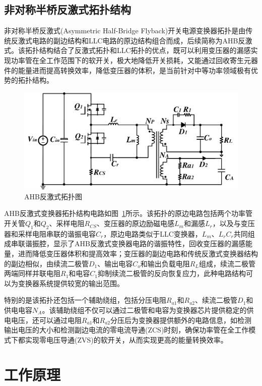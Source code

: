 \subsection{非对称半桥反激式拓扑结构}

非对称半桥反激式(Asymmetric Half-Bridge Flyback)开关电源变换器拓扑是由传统反激式电路的副边结构和LLC电路的原边结构组合而成，后续简称为AHB反激式。该拓扑结构结合了反激式拓扑和LLC拓扑的优点，既可以利用变压器的漏感实现功率管在全工作范围下的软开关，极大地降低开关损耗，又能通过回收寄生元器件的能量进而提高转换效率，降低变压器的体积，是当前针对中等功率领域极有优势的拓扑结构。

\begin{figure}[htbp] 
    \centering
    \includegraphics[width=0.8\linewidth]{figures/AHB拓扑图.pdf}
    \caption{AHB反激式拓扑图}
    \label{fig:AHB拓扑图}
\end{figure}

AHB反激式变换器拓扑结构电路如图~\ref{fig:AHB拓扑图}所示。该拓扑的原边电路包括两个功率管开关管$Q_1$和$Q_2$、采样电阻$R_{CS}$、变压器的原边励磁电感$L_m$和漏感$L_r$，以及与变压器和采样电阻串联的谐振电容$C_r$，原边电路类似于LLC变换器，$L_m$、$L_r$$C_r$共同组成串联谐振腔，显示了AHB反激式变换器电路的谐振特性，回收变压器的漏感能量，进而降低变压器体积和提高效率；变压器的副边电路和传统反激式变换器结构的副边相似，由续流二极管$D_1$、输出电容$C_o$和输出负载电阻$R_L$组成，续流二极管两端同样并联电阻$R_1$和电容$C_1$抑制续流二极管的反向恢复应力，此种电路结构可以为变换器系统提供较宽的输出范围。

特别的是该拓扑还包括一个辅助绕组，包括分压电阻$R_{a1}$和$R_{a2}$、续流二极管$D_1$和供电电容$N_A$。该辅助绕组不仅可以通过二极管和电容为变换器芯片提供稳定的供电电压，还可以通过电阻$R_{a1}$和$R_{a2}$分压后为变换器提供额外的电路信息，如检测输出电压的大小和检测副边电流的零电流导通(ZCS)时刻，确保功率管在全工作模式下都实现零电压导通(ZVS)的软开关，从而实现更高的能量转换效率。




\section{工作原理}
\label{sec:工作原理}


